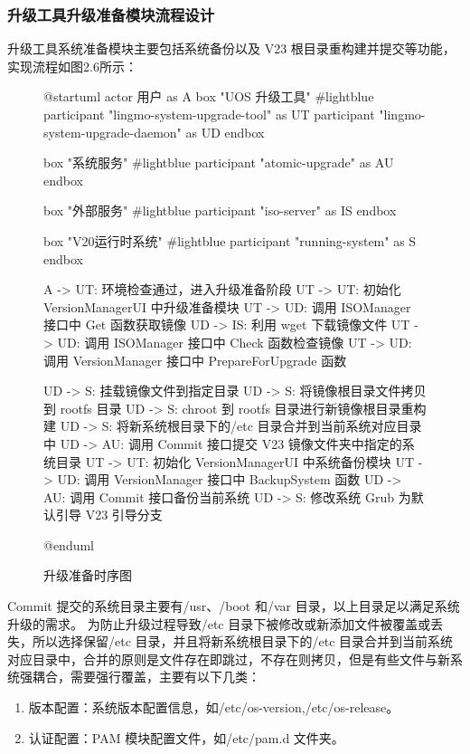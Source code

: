 \documentclass{utart}
\begin{document}
\subsubsection{升级工具升级准备模块流程设计}
升级工具系统准备模块主要包括系统备份以及 V23 根目录重构建并提交等功能，实现流程如图2.6所示：
\begin{figure}[H]
    \centering
    \begin{plantuml}
        @startuml
        actor 用户 as A 
        box "UOS 升级工具" #lightblue
        participant "lingmo-system-upgrade-tool" as UT
        participant "lingmo-system-upgrade-daemon" as UD                             
        endbox

        box "系统服务" #lightblue 
        participant "atomic-upgrade" as AU
        endbox
        
        box "外部服务" #lightblue
        participant "iso-server" as IS
        endbox

        box "V20运行时系统" #lightblue
        participant "running-system" as S
        endbox

        A -> UT: 环境检查通过，进入升级准备阶段
        UT -> UT: 初始化 VersionManagerUI 中升级准备模块
        UT -> UD: 调用 ISOManager 接口中 Get 函数获取镜像
        UD -> IS: 利用 wget 下载镜像文件
        UT -> UD: 调用 ISOManager 接口中 Check 函数检查镜像
        UT -> UD: 调用 VersionManager 接口中 PrepareForUpgrade 函数
        
        UD -> S: 挂载镜像文件到指定目录
        UD -> S: 将镜像根目录文件拷贝到 rootfs 目录
        UD -> S: chroot 到 rootfs 目录进行新镜像根目录重构建
        UD -> S: 将新系统根目录下的/etc 目录合并到当前系统对应目录中
        UD -> AU: 调用 Commit 接口提交 V23 镜像文件夹中指定的系统目录
        UT -> UT: 初始化 VersionManagerUI 中系统备份模块
        UT -> UD: 调用 VersionManager 接口中 BackupSystem 函数
        UD -> AU: 调用 Commit 接口备份当前系统
        UD -> S: 修改系统 Grub 为默认引导 V23 引导分支

        @enduml
    \end{plantuml}
    \caption{升级准备时序图}
    \label{fig:prepareupgrade}
\end{figure}

Commit 提交的系统目录主要有/usr、/boot 和/var 目录，以上目录足以满足系统升级的需求。
为防止升级过程导致/etc 目录下被修改或新添加文件被覆盖或丢失，所以选择保留/etc 目录，并且将新系统根目录下的/etc 目录合并到当前系统对应目录中，合并的原则是文件存在即跳过，不存在则拷贝，但是有些文件与新系统强耦合，需要强行覆盖，主要有以下几类：
\begin{enumerate}
    \item 版本配置：系统版本配置信息，如/etc/os-version,/etc/os-release。
    \item 认证配置：PAM 模块配置文件，如/etc/pam.d 文件夹。
\end{enumerate}
\end{document}
